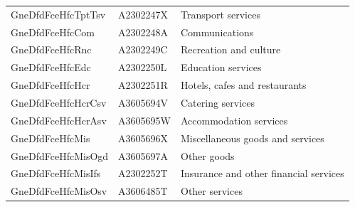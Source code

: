 \documentclass[graybox]{svmult}
\begin{document}
\begin{table}[H]
{\begin{tabular}[t]{lll}
			\addlinespace
			GneDfdFceHfcTptTsv & A2302247X & Transport services\\
			GneDfdFceHfcCom & A2302248A & Communications\\
			GneDfdFceHfcRnc & A2302249C & Recreation and culture\\
			GneDfdFceHfcEdc & A2302250L & Education services\\
			GneDfdFceHfcHcr & A2302251R & Hotels, cafes and restaurants\\
			\addlinespace
			GneDfdFceHfcHcrCsv & A3605694V & Catering services\\
			GneDfdFceHfcHcrAsv & A3605695W & Accommodation services\\
			GneDfdFceHfcMis & A3605696X & Miscellaneous goods and services\\
			GneDfdFceHfcMisOgd & A3605697A & Other goods\\
			GneDfdFceHfcMisIfs & A2302252T & Insurance and other financial services\\
			GneDfdFceHfcMisOsv & A3606485T & Other services\\
			\bottomrule
		\end{tabular}
		\label{Tab:Expenditure-hierarchy-3}
	}
\end{table}


\pagebreak



\end{document}
